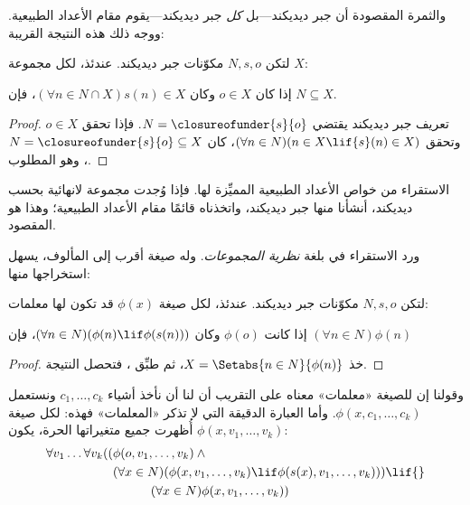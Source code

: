 \documentclass[../../../include/open-logic-section]{subfiles}
\begin{document}

والثمرة المقصودة أن جبر ديديكند---بل \emph{كل} جبر ديديكند---يقوم مقام الأعداد الطبيعية. ووجه ذلك هذه النتيجة القريبة:

\begin{thm}
لتكن $N, s, o$ مكوّنات جبر ديديكند. عندئذ، لكل مجموعة $X$:  
	\begin{center}
		إذا كان $o \in X$ وكان $(\forall {n} \in N \cap X){s}({n}) \in X$، {فإن} $N \subseteq X$.
	\end{center}
\end{thm}

\begin{proof}
تعريف جبر ديديكند يقتضي $N = \closureofunder{s}{o}$.
فإذا تحقق ${o} \in X$ وتحقق $(\forall {n} \in N)(n \in X \lif
{s}({n}) \in X)$، كان $N = \closureofunder{s}{o} \subseteq X$، وهو المطلوب.
\end{proof}

الاستقراء من خواص الأعداد الطبيعية المميِّزة لها. فإذا وُجدت مجموعة لانهائية بحسب ديديكند، أنشأنا منها جبر ديديكند، واتخذناه قائمًا مقام الأعداد الطبيعية؛ وهذا هو المقصود.

ورد الاستقراء في  بلغة
\emph{نظرية المجموعات}. وله صيغة أقرب إلى المألوف، يسهل استخراجها منها:

\begin{cor}
لتكن $N, s, o$ مكوّنات جبر ديديكند. عندئذ، لكل صيغة
$\phi(x)$ قد تكون لها معلمات:
\begin{center}
	إذا كانت $\phi(o)$ وكان $(\forall {n} \in N)(\phi(n)\lif
	\phi({s}({n})))$، {فإن} $(\forall n \in N)\phi(n)$
\end{center}
\end{cor}

\begin{proof}
خذ $X = \Setabs{n \in N}{\phi(n)}$، ثم طبِّق
، فتحصل النتيجة.
\end{proof}

وقولنا إن للصيغة «معلمات» معناه على التقريب أن لنا أن نأخذ أشياء
$c_1, \ldots, c_k$ ونستعمل $\phi(x, c_1, \ldots, c_k)$. وأما العبارة الدقيقة التي لا تذكر «المعلمات» فهذه: لكل صيغة
$\phi(x, v_1, \ldots, v_k)$ أُظهرت جميع متغيراتها الحرة، يكون:
	\begin{align*}
			\forall v_1 \ldots \forall v_k((&\phi(o, v_1,\ldots, v_k) \land {}\\
			&	(\forall x \in N)(\phi(x,v_1, \ldots, v_k) \lif \phi(s(x), v_1,\ldots, v_k))) \lif {}\\
			&\hspace{3em} (\forall x \in N)\phi(x, v_1,\ldots, v_k))
	\end{align*}
\end{document}

